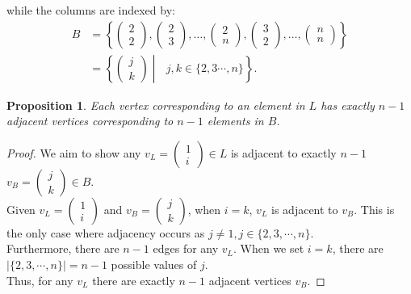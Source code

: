 \documentclass{article}
\newtheorem{proposition}{Proposition}
\begin{document}
while the columns are indexed by:
\begin{align*}
    B &= \left\{\begin{pmatrix} 2 \\ 2 \end{pmatrix}, \begin{pmatrix} 2 \\ 3 \end{pmatrix}, \dots, \begin{pmatrix} 2 \\ n \end{pmatrix}, \begin{pmatrix} 3 \\ 2 \end{pmatrix}, \dots, \begin{pmatrix} n \\ n \end{pmatrix}\right\} \\
    &= \left\{\begin{pmatrix}j \\k\end{pmatrix}\middle|\text{ } j,k\in\{2,3\cdots,n\}\right\}.
\end{align*}
\begin{proposition}
    Each vertex corresponding to an element in \(L\) has exactly \( n-1 \) adjacent vertices corresponding to \(n-1\) elements in \(B\).
\end{proposition}
\begin{proof}
    We aim to show any \(v_L = \begin{pmatrix}1\\i\end{pmatrix} \in L\) is adjacent to exactly \(n-1\) \(v_B = \begin{pmatrix}j\\k\end{pmatrix} \in B\). \\
    Given \(v_L = \begin{pmatrix}1\\i\end{pmatrix}\) and \(v_B = \begin{pmatrix}j\\k\end{pmatrix}\), when \(i = k\), \(v_L\) is adjacent to \(v_B\). This is the only case where adjacency occurs as \(j\neq 1, j\in\{2,3,\cdots,n\}\). \\
    Furthermore, there are \(n-1\) edges for any \(v_L\). When we set \(i=k\), there are \(|\{2,3,\cdots,n\}|=n-1\) possible values of \(j\). \\
    Thus, for any \(v_L\) there are exactly \(n-1\) adjacent vertices \(v_B\).
\end{proof}
\end{document}
